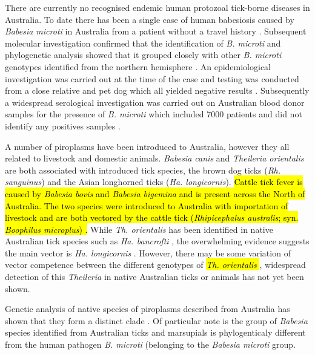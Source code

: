 \documentclass[a4paper, nobind]{templates/ociamthesis}
\begin{document}
There are currently no recognised endemic human protozoal tick-borne diseases in Australia.
To date there has been a single case of human babesiosis caused by \emph{Babesia microti} in Australia from a patient without a travel history \autocite{senanayakeFirstReportHuman2012}.
Subsequent molecular investigation confirmed that the identification of \emph{B. microti} and phylogenetic analysis showed that it grouped closely with other \emph{B. microti} genotypes identified from the northern hemisphere \autocite{papariniMolecularConfirmationFirst2014}.
An epidemiological investigation was carried out at the time of the case and testing was conducted from a close relative and pet dog which all yielded negative results \autocite{senanayakeFirstReportHuman2012}.
Subsequently a widespread serological investigation was carried out on Australian blood donor samples for the presence of \emph{B. microti} which included 7000 patients and did not identify any positives samples \autocite{faddyNoEvidenceWidespread2019}.

A number of piroplasms have been introduced to Australia, however they all related to livestock and domestic animals.
\emph{Babesia canis} and \emph{Theileria orientalis} are both associated with introduced tick species, the brown dog ticks (\emph{Rh. sanguinus}) and the Asian longhorned ticks (\emph{Ha. longicornis}).
\hl{Cattle tick fever is caused by \emph{Babesia bovis} and \emph{Babesia bigemina} and is present across the North of Australia. The two species were introduced to Australia with importation of livestock and are both vectored by the cattle tick (\emph{Rhipicephalus australis}; syn. \emph{Boophilus microplus}) \autocite{angusHistoryCattleTick1996}.}
While \emph{Th. orientalis} has been identified in native Australian tick species such as \emph{Ha. bancrofti} \autocite{lakewEndemicInfectionCattle2021}, the overwhelming evidence suggests the main vector is \emph{Ha. longicornis} \autocite{marendyHaemaphysalisLongicornisLifecycle2019}.
However, there may be some variation of vector competence between the different genotypes of \hl{\emph{Th. orientalis} \autocite{forshawTheileriaOrientalisIkeda2020}}, widespread detection of this \emph{Theileria} in native Australian ticks or animals has not yet been shown.

Genetic analysis of native species of piroplasms described from Australia has shown that they form a distinct clade \autocite{barbosaSequenceAnalysesMitochondrial2019}.
Of particular note is the group of \emph{Babesia} species identified from Australian ticks and marsupials is phylogenticaly different from the human pathogen \emph{B. microti} (belonging to the \emph{Babesia microti} group.
\end{document}
